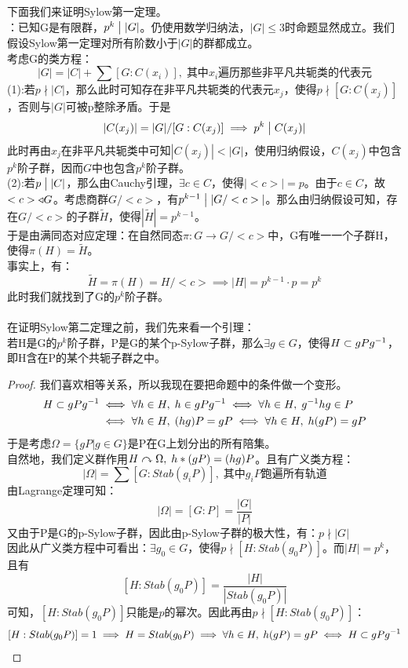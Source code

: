 下面我们来证明Sylow第一定理。\\
：已知G是有限群，$p^k\bigm| |G|$。仍使用数学归纳法，$|G|\leq 3$时命题显然成立。我们假设Sylow第一定理对所有阶数小于$|G|$的群都成立。\\
考虑G的类方程：
\[
|G|=|C|+\sum[G:C(x_i)],\;\text{其中}x_i \text{遍历那些非平凡共轭类的代表元}
\]
\indent(1):若$p\nmid |C|$，那么此时可知存在非平凡共轭类的代表元$x_j$，使得$p\nmid [G:C(x_j)]$，否则与$|G|$可被p整除矛盾。于是
\[
|C(x_j)|=|G|/[G:C(x_j)]\implies p^k\bigm |C(x_j)|
\]
此时再由$x_j$在非平凡共轭类中可知$|C(x_j)|<|G|$，使用归纳假设，$C(x_j)$中包含$p^k$阶子群，因而$G$中也包含$p^k$阶子群。\\
\indent(2):若$p\bigm| |C|$，那么由Cauchy引理，$\exists c\in C$，使得$|<c>|=p$。由于$c\in C$，故$<c>\triangleleft G$。考虑商群$G/<c>$，有$p^{k-1}\bigm| |G/<c>|$。那么由归纳假设可知，存在$G/<c>$的子群$\tilde{H}$，使得$|\tilde{H}|=p^{k-1}$。\\
于是由满同态对应定理：在自然同态$\pi\colon G\to G/<c>$中，G有唯一一个子群H，使得$\pi(H)=\tilde{H}$。\\
事实上，有：
\[
\tilde{H}=\pi(H)=H/<c>\implies |H|=p^{k-1}\cdot p=p^k
\]
此时我们就找到了G的$p^k$阶子群。\\
\\
在证明Sylow第二定理之前，我们先来看一个引理：\\
若H是G的$p^k$阶子群，P是G的某个p-Sylow子群，那么$\exists g\in G$，使得$H\subset gP{g}^{-1}$，即H含在P的某个共轭子群之中。\\
\begin{proof}
我们喜欢相等关系，所以我现在要把命题中的条件做一个变形。
\[
\begin{aligned}
H\subset gP{g}^{-1}&\iff \forall h\in H,\; h\in gP{g}^{-1} \iff \forall h\in H,\; {g}^{-1}hg\in P\\
&\iff \forall h\in H,\; (hg)P=gP\iff \forall h\in H,\; h(gP)=gP
\end{aligned}
\]
于是考虑$\Omega=\{gP|g\in G\}$是P在G上划分出的所有陪集。\\
自然地，我们定义群作用$H\curvearrowright \Omega,\; h*(gP)=(hg)P$。且有广义类方程：
\[
|\Omega|=\sum[G:Stab(g_iP)],\;\text{其中}g_iP\text{跑遍所有轨道}
\]
由Lagrange定理可知：
\[
|\Omega|=[G:P]=\frac{|G|}{|P|}
\]
又由于P是G的p-Sylow子群，因此由p-Sylow子群的极大性，有：$p\nmid |G|$\\
因此从广义类方程中可看出：$\exists g_0\in G$，使得$p\nmid [H:Stab(g_0P)]$。而$|H|=p^k$，且有
\[
[H:Stab(g_0P)]=\frac{|H|}{|Stab(g_0P)|}
\]
可知，$[H:Stab(g_0P)]$只能是$p$的幂次。因此再由$p\nmid [H:Stab(g_0P)]$：
\[
[H:Stab(g_0P)]=1\implies H=Stab(g_0P)\implies \forall h\in H,\; h(gP)=gP\iff H\subset gP{g}^{-1}
\]
\end{proof}
